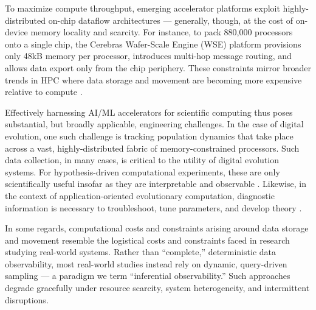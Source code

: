 To maximize compute throughput, emerging accelerator platforms exploit highly-distributed on-chip dataflow architectures --- generally, though, at the cost of on-device memory locality and scarcity.
For instance, to pack 880,000 processors onto a single chip, the Cerebras Wafer-Scale Engine (WSE) platform provisions only 48kB memory per processor, introduces multi-hop message routing, and allows data export only from the chip periphery.
These constraints mirror broader trends in HPC where data storage and movement are becoming more expensive relative to compute \cite{Buluc2021,khan2021analysis,gholami2024ai}.


Effectively harnessing AI/ML accelerators for scientific computing thus poses substantial, but broadly applicable, engineering challenges.
In the case of digital evolution, one such challenge is tracking population dynamics that take place across a vast, highly-distributed fabric of memory-constrained processors.
Such data collection, in many cases, is critical to the utility of digital evolution systems.
For hypothesis-driven computational experiments, these are only scientifically useful insofar as they are interpretable and observable \cite{casti1997wouldbe}.
Likewise, in the context of application-oriented evolutionary computation, diagnostic information is necessary to troubleshoot, tune parameters, and develop theory \cite{hernandez2022dossier,Hooker1995}.

In some regards, computational costs and constraints arising around data storage and movement resemble the logistical costs and constraints faced in research studying real-world systems.
Rather than ``complete,'' deterministic data observability, most real-world studies instead rely on dynamic, query-driven sampling --- a paradigm we term ``inferential observability.''
Such approaches degrade gracefully under resource scarcity, system heterogeneity, and intermittent disruptions.

